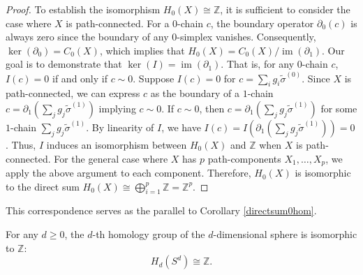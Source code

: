 \begin{proof}
	To establish the isomorphism \( H_{0}(X) \cong \mathbb{Z} \), it is sufficient to consider the case where \( X \) is path-connected. For a \( 0 \)-chain \( c \), the boundary operator \( \partial_{0}(c) \) is always zero since the boundary of any \( 0 \)-simplex vanishes. Consequently, \( \ker(\partial_{0}) = C_{0}(X) \), which implies that $H_{0}(X) = C_{0}(X) / \operatorname{im}(\partial_{1})$. Our goal is to demonstrate that \( \ker(I) = \operatorname{im}(\partial_{1}) \). That is, for any \( 0 \)-chain \( c \), \( I(c) = 0 \) if and only if \( c \sim 0 \). Suppose \( I(c) = 0 \) for \( c = \sum_{i} g_{i} \tilde{\sigma}^{(0)} \). Since \( X \) is path-connected, we can express \( c \) as the boundary of a \( 1 \)-chain $c = \partial_{1} ( \sum_{j} g_{j} \tilde{\sigma}^{(1)})$ implying $c \sim 0$. If \( c \sim 0 \), then \( c = \partial_{1} ( \sum_{j} g_{j} \tilde{\sigma}^{(1)}) \) for some \( 1 \)-chain \( \sum_{j} g_{j} \tilde{\sigma}^{(1)} \). By linearity of \( I \), we have	$I(c) = I( \partial_{1} ( \sum_{j} g_{j} \tilde{\sigma}^{(1)} )) = 0$. Thus, \( I \) induces an isomorphism between \( H_{0}(X) \) and \( \mathbb{Z} \) when \( X \) is path-connected. For the general case where \( X \) has \( p \) path-components \( X_{1}, \ldots, X_{p} \), we apply the above argument to each component. Therefore, \( H_{0}(X) \) is isomorphic to the direct sum $H_{0}(X) \cong \bigoplus_{i=1}^{p} \mathbb{Z} = \mathbb{Z}^p$.
\end{proof}

This correspondence serves as the parallel to Corollary \ref{directsum0hom}.

\begin{example}
    For any $d \geq 0$, the $d$-th homology group of the $d$-dimensional sphere is isomorphic to $\mathbb{Z}$:
    \[
    H_{d}(S^{d}) \cong \mathbb{Z}.
    \]
\end{example}

